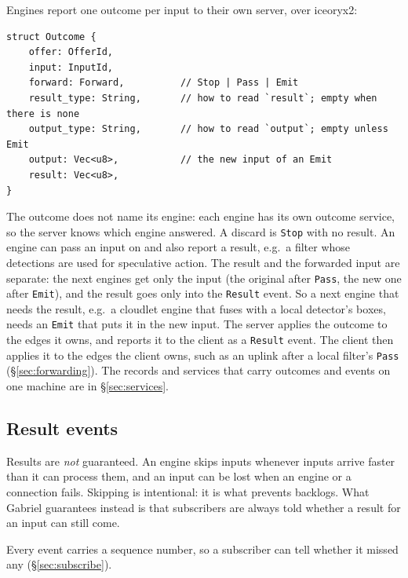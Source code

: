 \documentclass[11pt]{article}
\newcommand{\code}[1]{\texttt{#1}}
\begin{document}
Engines report one outcome per input to their own server, over iceoryx2:
\begin{lstlisting}
struct Outcome {
    offer: OfferId,
    input: InputId,
    forward: Forward,          // Stop | Pass | Emit
    result_type: String,       // how to read `result`; empty when there is none
    output_type: String,       // how to read `output`; empty unless Emit
    output: Vec<u8>,           // the new input of an Emit
    result: Vec<u8>,
}
\end{lstlisting}
The outcome does not name its engine: each engine has its own outcome
service, so the server knows which engine answered. A discard is \code{Stop}
with no result. An engine can pass an input on and also report a result,
e.g.\ a filter whose detections are used for speculative action. The result
and the forwarded input are separate: the next engines get only the input
(the original after \code{Pass}, the new one after \code{Emit}), and the
result goes only into the \code{Result} event. So a next engine that needs
the result, e.g.\ a cloudlet engine that fuses with a local detector's boxes,
needs an \code{Emit} that puts it in the new input. The server applies the outcome to the edges it owns, and
reports it to the client as a \code{Result} event. The client then applies it
to the edges the client owns, such as an uplink after a local filter's
\code{Pass} (\S\ref{sec:forwarding}). The records and services that carry
outcomes and events on one machine are in \S\ref{sec:services}.

\subsection{Result events}
\label{sec:events}

Results are \emph{not} guaranteed. An engine skips inputs whenever inputs
arrive faster than it can process them, and an input can be lost when an
engine or a connection fails. Skipping is intentional: it is what prevents
backlogs. What Gabriel guarantees instead is that subscribers are always told
whether a result for an input can still come.

Every event carries a sequence number, so a subscriber can tell whether it
missed any (\S\ref{sec:subscribe}).
\end{document}

